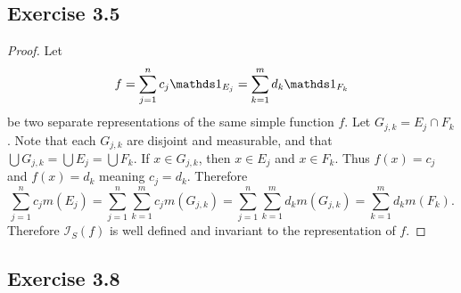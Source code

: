 \documentclass[hw_all.tex]{subfiles}
\begin{document}
\subsection{Exercise 3.5}

\begin{proof}
    Let
    \[
        f = \sum_{j=1}^n c_j \ind{E_j} = \sum_{k=1}^m d_k \ind{F_k}
    \]
    be two separate representations of the same simple function $f$. Let $G_{j,k} = E_j \cap F_k$. Note that each $G_{j,k}$ are disjoint and measurable, and that $\bigcup G_{j,k} = \bigcup {E_j} = \bigcup F_{k}$. If $x \in G_{j,k}$, then $x \in E_j$ and $x \in F_k$. Thus $f(x) = c_j$ and $f(x) = d_k$ meaning $c_j = d_k$. Therefore
    \[
        \sum_{j=1}^n c_j m(E_j) = \sum_{j=1}^n \sum_{k=1}^m c_j m(G_{j,k}) = \sum_{j=1}^n \sum_{k=1}^m d_k m(G_{j,k}) = \sum_{k=1}^m d_k m(F_k)
    .\]
    Therefore $\mathcal{I}_S(f)$ is well defined and invariant to the representation of $f$.
\end{proof}

\subsection{Exercise 3.8}
\end{document}
